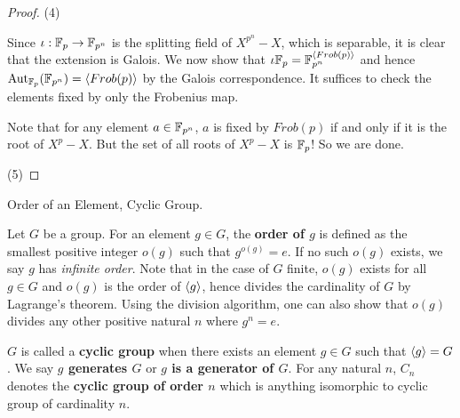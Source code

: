 \documentclass[../book.tex]{subfiles}
\begin{document}
\begin{proof}
    (4)
        
        Since $\iota : \mathbb{F}_p \to \mathbb{F}_{p^n}$ is the splitting field of $X^{p^n} - X$, 
        which is separable, it is clear that the extension is Galois.
        We now show that $\iota \mathbb{F}_p = \mathbb{F}_{p^n}^{\langle Frob(p)\rangle}$
        and hence $\text{Aut}_{\mathbb{F}_p}(\mathbb{F}_{p^n}) = \langle Frob(p)\rangle$ by the Galois correspondence.
        It suffices to check the elements fixed by only the Frobenius map. 
        
        Note that for any element $a \in \mathbb{F}_{p^n}$,
        $a$ is fixed by $Frob(p)$ if and only if it is the root of $X^p - X$. 
        But the set of all roots of $X^p - X$ is $\mathbb{F}_p$!
        So we are done. 
        
    (5)
    
\end{proof}


\begin{dfn} Order of an Element, Cyclic Group.
    
    Let $G$ be a group. 
    For an element $g \in G$, the \textbf{order of $g$} is defined as 
    the smallest positive integer $o(g)$ such that $g^{o(g)} = e$. 
    If no such $o(g)$ exists, we say $g$ has \emph{infinite order}. 
    Note that in the case of $G$ finite, 
    $o(g)$ exists for all $g \in G$ and $o(g)$ is the order of $\langle g\rangle$,
    hence divides the cardinality of $G$ by Lagrange's theorem. 
    Using the division algorithm, one can also show that $o(g)$
    divides any other positive natural $n$ where $g^n = e$. 
    
    $G$ is called a \textbf{cyclic group} when 
    there exists an element $g \in G$ such that $\langle g\rangle = G$. 
    We say \textbf{$g$ generates $G$} or \textbf{$g$ is a generator of $G$}.
    For any natural $n$, $C_n$ denotes the \textbf{cyclic group of order $n$}
    which is anything isomorphic to cyclic group of cardinality $n$. 
\end{dfn}
\end{document}

